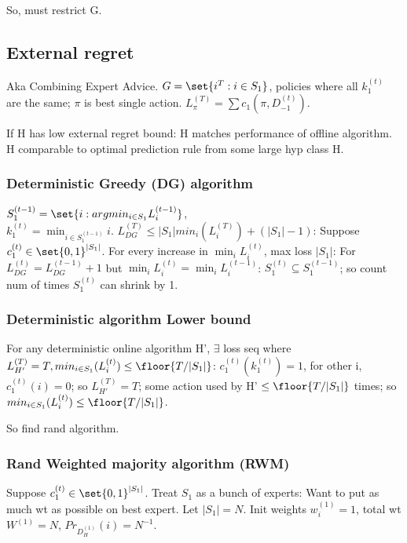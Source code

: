 \documentclass[oneside, article]{memoir}
\begin{document}
So, must restrict G.

\subsection{External regret}
Aka Combining Expert Advice. $G = \set{i^{T} : i \in S_{1}}$, policies where all $k_{1}^{(t)}$ are the same; $\pi$ is best single action. $L_{\pi}^{(T)} = \sum c_{1}(\pi, D_{-1}^{(t)})$.

If H has low external regret bound: H matches performance of offline algorithm. \why  H comparable to optimal prediction rule from some large hyp class H. \why

\subsubsection{Deterministic Greedy (DG) algorithm}
$S_{1}^{(t-1)} = \set{i: argmin_{i \in S_{1}} L_{i}^{(t-1)}}$,\\
 $k_{1}^{(t)} = \min_{i \in S_{1}^{(t-1)}} i$. $L_{DG}^{(T)} \leq |S_{1}| min_{i}(L_{i}^{(T)}) + (|S_{1}|-1)$: Suppose $c_{1}^{(t)} \in \set{0,1}^{|S_{1}|}$. For every increase in 
$\min_{i} L_{i}^{(t)}$, max loss $|S_{1}|$: For $L_{DG}^{(t)} = L_{DG}^{(t-1)} + 1$ but $\min_{i} L_{i}^{(t)} = \min_{i}L_{i}^{(t-1)}$: $S_{1}^{(t)} \subseteq S_{1}^{(t-1)}$; so count num of times $S_{1}^{(t)}$ can shrink by 1.

\subsubsection{Deterministic algorithm Lower bound} For any deterministic online algorithm H', $\exists$ loss seq where $L_{H'}^{(T)} = T, min_{i \in S_{1}}(L_{i}^{(t)}) \leq \floor{T/|S_{1}|}$: $c_{1}^{(t)}(k_{1}^{(t)}) = 1$, for other i, $c_{1}^{(t)}(i) = 0$; so $L_{H'}^{(T)} = T$; some action used by H' $\leq \floor{T/|S_{1}|}$ times; so $min_{i \in S_{1}}(L_{i}^{(t)}) \leq \floor{T/|S_{1}|}$.

So find rand algorithm.

\subsubsection{Rand Weighted majority algorithm (RWM)}
Suppose $c_{1}^{(t)} \in \set{0,1}^{|S_{1}|}$. Treat $S_{1}$ as a bunch of experts: Want to put as much wt as possible on best expert. Let $|S_{1}| = N$. Init weights $w_{i}^{(1)} = 1$, total wt $W^{(1)} = N$, $Pr_{D_{H}^{(1)}}(i) = N^{-1}$.
\end{document}
